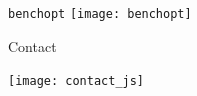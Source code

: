 \documentclass[unknownkeysallowed]{beamer}
\begin{document}
\begin{frame}{\texttt{benchopt}}
    \centering
    \texttt{[image: benchopt]}\\
\end{frame}


\begin{frame}{Contact}

\vspace{0.4cm}
\centering
\texttt{[image: contact\_js]}
\end{frame}



\end{document}
